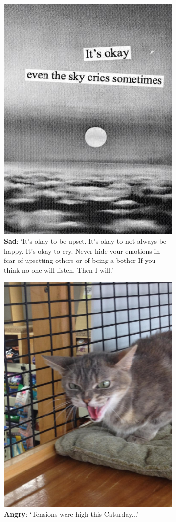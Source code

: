 \begin{figure}
\begin{subfigure}[t]{.5\textwidth}
  \includegraphics[width=.6\linewidth]{Images/sad.jpg}
  \caption{\textbf{Sad}: `It's okay to be upset. It's okay to not always be happy. It's okay to cry. Never hide your emotions in fear of upsetting others or of being a bother   If you think no one will listen. Then I will.'}
\end{subfigure}
\begin{subfigure}[t]{.5\textwidth}
  \vskip 0pt 
  \centering
  \includegraphics[width=.5\linewidth]{Images/angry.jpg}
  \caption{\textbf{Angry}: `Tensions were high this Caturday...'}
\end{subfigure}
\begin{subfigure}[t]{.5\textwidth}
  \vskip 0pt 
  \centering

\end{subfigure}
\end{figure}
